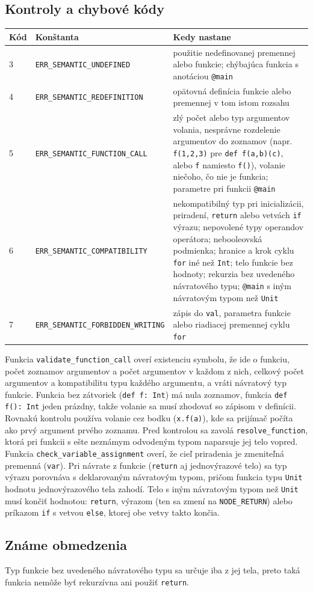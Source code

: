 \subsection{Kontroly a chybové kódy}
\begin{longtable}{p{0.8cm} p{6.3cm} p{7.5cm}}
\toprule
\textbf{Kód} & \textbf{Konštanta} & \textbf{Kedy nastane} \\
\midrule
\endhead
3 & \texttt{ERR\_SEMANTIC\_UNDEFINED} & použitie nedefinovanej premennej alebo funkcie; chýbajúca funkcia s anotáciou \texttt{@main} \\
4 & \texttt{ERR\_SEMANTIC\_REDEFINITION} & opätovná definícia funkcie alebo premennej v tom istom rozsahu \\
5 & \texttt{ERR\_SEMANTIC\_FUNCTION\_CALL} & zlý počet alebo typ argumentov volania, nesprávne rozdelenie argumentov do zoznamov (napr. \texttt{f(1,2,3)} pre \texttt{def f(a,b)(c)}, alebo \texttt{f} namiesto \texttt{f()}), volanie niečoho, čo nie je funkcia; parametre pri funkcii \texttt{@main} \\
6 & \texttt{ERR\_SEMANTIC\_COMPATIBILITY} & nekompatibilný typ pri inicializácii, priradení, \texttt{return} alebo vetvách \texttt{if} výrazu; nepovolené typy operandov operátora; nebooleovská podmienka; hranice a krok cyklu \texttt{for} iné než \texttt{Int}; telo funkcie bez hodnoty; rekurzia bez uvedeného návratového typu; \texttt{@main} s iným návratovým typom než \texttt{Unit} \\
7 & \texttt{ERR\_SEMANTIC\_FORBIDDEN\_WRITING} & zápis do \texttt{val}, parametra funkcie alebo riadiacej premennej cyklu \texttt{for} \\
\bottomrule
\end{longtable}

Funkcia \texttt{validate\_function\_call} overí existenciu symbolu, že ide o funkciu, počet zoznamov argumentov a počet argumentov v každom z nich, celkový počet argumentov a kompatibilitu typu každého argumentu, a vráti návratový typ funkcie. Funkcia bez zátvoriek (\texttt{def f: Int}) má nula zoznamov, funkcia \texttt{def f(): Int} jeden prázdny, takže volanie sa musí zhodovať so zápisom v definícii. Rovnakú kontrolu používa volanie cez bodku (\texttt{x.f(a)}), kde sa prijímač počíta ako prvý argument prvého zoznamu. Pred kontrolou sa zavolá \texttt{resolve\_function}, ktorá pri funkcii s ešte neznámym odvodeným typom naparsuje jej telo vopred. Funkcia \texttt{check\_variable\_assignment} overí, že cieľ priradenia je zmeniteľná premenná (\texttt{var}). Pri návrate z funkcie (\texttt{return} aj jednovýrazové telo) sa typ výrazu porovnáva s deklarovaným návratovým typom, pričom funkcia typu \texttt{Unit} hodnotu jednovýrazového tela zahodí. Telo s iným návratovým typom než \texttt{Unit} musí končiť hodnotou: \texttt{return}, výrazom (ten sa zmení na \texttt{NODE\_RETURN}) alebo príkazom \texttt{if} s vetvou \texttt{else}, ktorej obe vetvy takto končia.

\subsection{Známe obmedzenia}
Typ funkcie bez uvedeného návratového typu sa určuje iba z jej tela, preto taká funkcia nemôže byť rekurzívna ani použiť \texttt{return}.